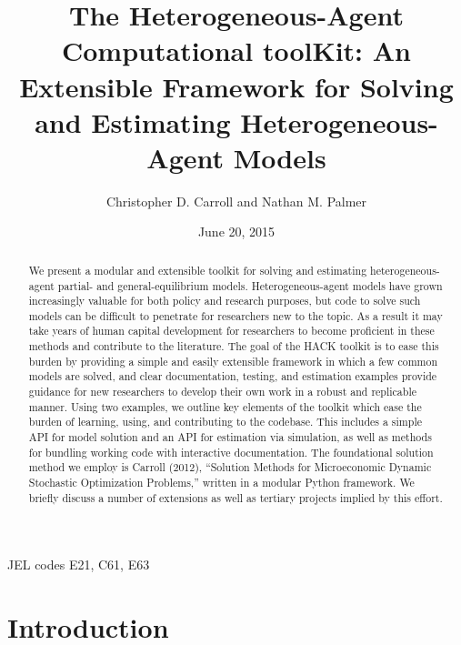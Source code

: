 \documentclass[]{article}
\title{The Heterogeneous-Agent Computational toolKit: An Extensible Framework
for Solving and Estimating Heterogeneous-Agent Models}
\author{Christopher D. Carroll and Nathan M. Palmer}
\date{June 20, 2015}
\begin{document}
\maketitle

\begin{abstract}
We present a modular and extensible toolkit for solving and estimating
heterogeneous-agent partial- and general-equilibrium models.
Heterogeneous-agent models have grown increasingly valuable for both
policy and research purposes, but code to solve such models can be
difficult to penetrate for researchers new to the topic. As a result it
may take years of human capital development for researchers to become
proficient in these methods and contribute to the literature. The goal
of the HACK toolkit is to ease this burden by providing a simple and
easily extensible framework in which a few common models are solved, and
clear documentation, testing, and estimation examples provide guidance
for new researchers to develop their own work in a robust and replicable
manner. Using two examples, we outline key elements of the toolkit which
ease the burden of learning, using, and contributing to the codebase.
This includes a simple API for model solution and an API for estimation
via simulation, as well as methods for bundling working code with
interactive documentation. The foundational solution method we employ is
Carroll (2012), ``Solution Methods for Microeconomic Dynamic Stochastic
Optimization Problems,'' written in a modular Python framework. We
briefly discuss a number of extensions as well as tertiary projects
implied by this effort.
\end{abstract}

\centerline{JEL codes E21, C61, E63}

\section{Introduction}\label{introduction}
\end{document}
